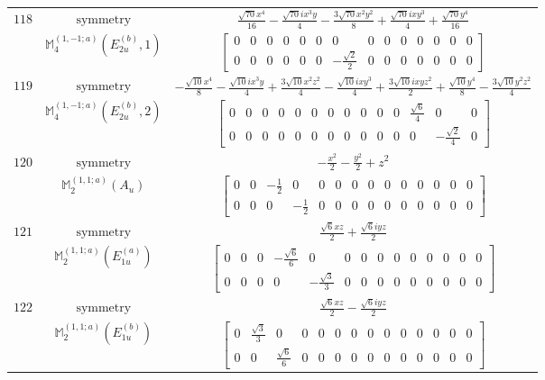 \documentclass[fleqn,8pt,landscape]{jsarticle}
\begin{document}
\begin{longtable}{ccc}
$ 118 $ & $ \text{symmetry} $ & $ \frac{\sqrt{70} x^{4}}{16} - \frac{\sqrt{70} i x^{3} y}{4} - \frac{3 \sqrt{70} x^{2} y^{2}}{8} + \frac{\sqrt{70} i x y^{3}}{4} + \frac{\sqrt{70} y^{4}}{16} $ \\
$  $ & $ \mathbb{M}_{4}^{(1,-1;a)}(E_{2u}^{(b)},1) $ & $ \begin{bmatrix} 0 & 0 & 0 & 0 & 0 & 0 & 0 & 0 & 0 & 0 & 0 & 0 & 0 & 0 \\ 0 & 0 & 0 & 0 & 0 & 0 & - \frac{\sqrt{2}}{2} & 0 & 0 & 0 & 0 & 0 & 0 & 0 \end{bmatrix} $ \\ \hline
$ 119 $ & $ \text{symmetry} $ & $ - \frac{\sqrt{10} x^{4}}{8} - \frac{\sqrt{10} i x^{3} y}{4} + \frac{3 \sqrt{10} x^{2} z^{2}}{4} - \frac{\sqrt{10} i x y^{3}}{4} + \frac{3 \sqrt{10} i x y z^{2}}{2} + \frac{\sqrt{10} y^{4}}{8} - \frac{3 \sqrt{10} y^{2} z^{2}}{4} $ \\
$  $ & $ \mathbb{M}_{4}^{(1,-1;a)}(E_{2u}^{(b)},2) $ & $ \begin{bmatrix} 0 & 0 & 0 & 0 & 0 & 0 & 0 & 0 & 0 & 0 & 0 & \frac{\sqrt{6}}{4} & 0 & 0 \\ 0 & 0 & 0 & 0 & 0 & 0 & 0 & 0 & 0 & 0 & 0 & 0 & - \frac{\sqrt{2}}{4} & 0 \end{bmatrix} $ \\ \hline
$ 120 $ & $ \text{symmetry} $ & $ - \frac{x^{2}}{2} - \frac{y^{2}}{2} + z^{2} $ \\
$  $ & $ \mathbb{M}_{2}^{(1,1;a)}(A_{u}) $ & $ \begin{bmatrix} 0 & 0 & - \frac{1}{2} & 0 & 0 & 0 & 0 & 0 & 0 & 0 & 0 & 0 & 0 & 0 \\ 0 & 0 & 0 & - \frac{1}{2} & 0 & 0 & 0 & 0 & 0 & 0 & 0 & 0 & 0 & 0 \end{bmatrix} $ \\ \hline
$ 121 $ & $ \text{symmetry} $ & $ \frac{\sqrt{6} x z}{2} + \frac{\sqrt{6} i y z}{2} $ \\
$  $ & $ \mathbb{M}_{2}^{(1,1;a)}(E_{1u}^{(a)}) $ & $ \begin{bmatrix} 0 & 0 & 0 & - \frac{\sqrt{6}}{6} & 0 & 0 & 0 & 0 & 0 & 0 & 0 & 0 & 0 & 0 \\ 0 & 0 & 0 & 0 & - \frac{\sqrt{3}}{3} & 0 & 0 & 0 & 0 & 0 & 0 & 0 & 0 & 0 \end{bmatrix} $ \\ \hline
$ 122 $ & $ \text{symmetry} $ & $ \frac{\sqrt{6} x z}{2} - \frac{\sqrt{6} i y z}{2} $ \\
$  $ & $ \mathbb{M}_{2}^{(1,1;a)}(E_{1u}^{(b)}) $ & $ \begin{bmatrix} 0 & \frac{\sqrt{3}}{3} & 0 & 0 & 0 & 0 & 0 & 0 & 0 & 0 & 0 & 0 & 0 & 0 \\ 0 & 0 & \frac{\sqrt{6}}{6} & 0 & 0 & 0 & 0 & 0 & 0 & 0 & 0 & 0 & 0 & 0 \end{bmatrix} $ \\ \hline

\end{longtable}
\end{document}
